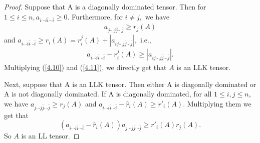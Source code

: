 \documentclass[10pt,a4paper]{amsart}
\begin{document}
\begin{proof}
Suppose that A is a diagonally dominated tensor. Then for $1\leq i\leq n, a_{i\cdots i\bar{i}\cdots\bar{i}}\geq 0.$ Furthermore, for $i\neq j,$  we have
\begin{align} a_{j\cdots j\bar{j}\cdots\bar{j}}\geq r_{j}(A) \label{4.10}\end{align} and
$a_{i\cdots i\bar{i}\cdots\bar{i}}\geq r_{i}(A)=r_{i}^{j}(A)+|a_{ij\cdots j\bar{j}\cdots \bar{j}}|,$
i.e., \begin{align}  a_{i\cdots i\bar{i}\cdots\bar{i}}-r_{i}^{j}(A)\geq |a_{ij\cdots j\bar{j}\cdots \bar{j}}|.\label{4.11}\end{align}
Multiplying (\ref{4.10}) and (\ref{4.11}), we directly get that $A$ is an LLK tensor.

Next, suppose that A is an LLK tensor. Then either A is diagonally dominated or A is not diagonally dominated.
If A is diagonally dominated, for all $1\leq i, j\leq n$, we have
$a_{j\cdots j\bar{j}\cdots\bar{j}}\geq r_{j}(A)$ and
$a_{i\cdots i\bar{i}\cdots\bar{i}}-\hat{r}_{i}(A)\geq r'_{i}(A).$
Multiplying them we get that $$(a_{i\cdots i\bar{i}\cdots\bar{i}}-\hat{r}_{i}(A))a_{j\cdots j\bar{j}\cdots\bar{j}}\geq r'_{i}(A)r_{j}(A).$$
So $A$ is an LL tensor.


\end{proof}
\end{document}
